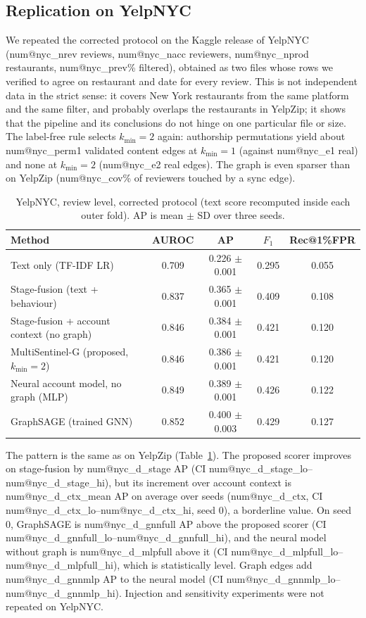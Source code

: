 \documentclass[pdflatex,sn-basic]{sn-jnl}
\makeatletter
\theoremstyle{thmstyleone}
\theoremstyle{thmstylethree}
\newcommand{\num}[1]{\csname num@#1\endcsname}
\makeatother
\begin{document}
\subsection{Replication on YelpNYC}\label{sec:res_nyc}
We repeated the corrected protocol on the Kaggle release of YelpNYC (\num{nyc_nrev} reviews, \num{nyc_nacc} reviewers, \num{nyc_nprod} restaurants, \num{nyc_prev}\% filtered), obtained as two files whose rows we verified to agree on restaurant and date for every review. This is not independent data in the strict sense: it covers New York restaurants from the same platform and the same filter, and probably overlaps the restaurants in YelpZip; it shows that the pipeline and its conclusions do not hinge on one particular file or size. The label-free rule selects $k_{\min}=2$ again: authorship permutations yield about \num{nyc_perm1} validated content edges at $k_{\min}=1$ (against \num{nyc_e1} real) and none at $k_{\min}=2$ (\num{nyc_e2} real edges). The graph is even sparser than on YelpZip (\num{nyc_cov}\% of reviewers touched by a sync edge).

\begin{table}[t]
\caption{YelpNYC, review level, corrected protocol (text score recomputed inside each outer fold). AP is mean $\pm$ SD over three seeds.}\label{tab:nyc}
\small\setlength{\tabcolsep}{3pt}
\begin{tabular}{@{}lcccc@{}}
\toprule
Method & AUROC & AP & $F_1$ & Rec@1\%FPR \\
\midrule
Text only (TF-IDF LR) & 0.709 & 0.226 $\pm$ 0.001 & 0.295 & 0.055 \\
Stage-fusion (text + behaviour) & 0.837 & 0.365 $\pm$ 0.001 & 0.409 & 0.108 \\
Stage-fusion + account context (no graph) & 0.846 & 0.384 $\pm$ 0.001 & 0.421 & 0.120 \\
MultiSentinel-G (proposed, $k_{\min}=2$) & 0.846 & 0.386 $\pm$ 0.001 & 0.421 & 0.120 \\
Neural account model, no graph (MLP) & 0.849 & 0.389 $\pm$ 0.001 & 0.426 & 0.122 \\
GraphSAGE (trained GNN) & 0.852 & 0.400 $\pm$ 0.003 & 0.429 & 0.127 \\
\bottomrule
\end{tabular}
\end{table}

The pattern is the same as on YelpZip (Table~\ref{tab:nyc}). The proposed scorer improves on stage-fusion by \num{nyc_d_stage} AP (CI \num{nyc_d_stage_lo}--\num{nyc_d_stage_hi}), but its increment over account context is \num{nyc_d_ctx_mean} AP on average over seeds (\num{nyc_d_ctx}, CI \num{nyc_d_ctx_lo}--\num{nyc_d_ctx_hi}, seed 0), a borderline value. On seed 0, GraphSAGE is \num{nyc_d_gnnfull} AP above the proposed scorer (CI \num{nyc_d_gnnfull_lo}--\num{nyc_d_gnnfull_hi}), and the neural model without graph is \num{nyc_d_mlpfull} above it (CI \num{nyc_d_mlpfull_lo}--\num{nyc_d_mlpfull_hi}), which is statistically level. Graph edges add \num{nyc_d_gnnmlp} AP to the neural model (CI \num{nyc_d_gnnmlp_lo}--\num{nyc_d_gnnmlp_hi}). Injection and sensitivity experiments were not repeated on YelpNYC.
\end{document}
